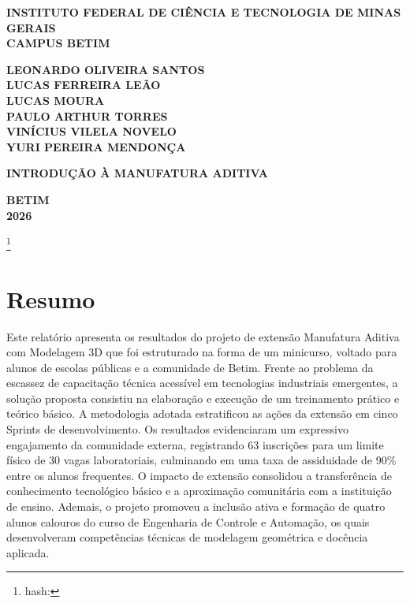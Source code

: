 \documentclass[12pt,a4paper]{article}
\newcommand{\gitcommit}{} %
\begin{document}
\begin{center}
    \large\textbf{INSTITUTO FEDERAL DE CIÊNCIA E TECNOLOGIA DE MINAS GERAIS} \\
    \large\textbf{CAMPUS BETIM} \\
    
    \vspace{4cm} %
    
    \large\textbf{LEONARDO OLIVEIRA SANTOS} \\
    \large\textbf{LUCAS FERREIRA LEÃO} \\
    \large\textbf{LUCAS MOURA} \\
    \large\textbf{PAULO ARTHUR TORRES} \\
    \large\textbf{VINÍCIUS VILELA NOVELO} \\
    \large\textbf{YURI PEREIRA MENDONÇA} \\

    
    \vspace{5cm}
    
    \LARGE\textbf{INTRODUÇÃO À MANUFATURA ADITIVA} \\
    
    \vfill %
    
    \large\textbf{BETIM} \\
    \large\textbf{2026}
\end{center}

\newpage %

\capafalse %
\imprimircapa %

\footnote{hash: \gitcommit}

\section{Resumo}
Este relatório apresenta os resultados do projeto de extensão Manufatura Aditiva com Modelagem 3D que foi estruturado na forma de um minicurso, voltado para alunos de escolas públicas e a comunidade de Betim. Frente ao problema da escassez de capacitação técnica acessível em tecnologias industriais emergentes, a solução proposta consistiu na elaboração e execução de um treinamento prático e teórico básico. A metodologia adotada estratificou as ações da extensão em cinco Sprints de desenvolvimento. Os resultados evidenciaram um expressivo engajamento da comunidade externa, registrando 63 inscrições para um limite físico de 30 vagas laboratoriais, culminando em uma taxa de assiduidade de 90\% entre os alunos frequentes. O impacto de extensão consolidou a transferência de conhecimento tecnológico básico e a aproximação comunitária com a instituição de ensino. Ademais, o projeto promoveu a inclusão ativa e formação de quatro alunos calouros do curso de Engenharia de Controle e Automação, os quais desenvolveram competências técnicas de modelagem geométrica e docência aplicada.
\end{document}
